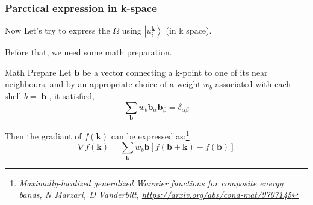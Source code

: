 \documentclass{beamer}
\begin{document}
  \begin{frame}
    \frametitle{Parctical expression in k-space}

    Now Let's try to express the \(\Omega\) using \(\left|u_i^{\mathbf{k}}\right\rangle\) (in k space). 

    Before that, we need some math preparation.

    \begin{block}{Math Prepare}
      Let \(\mathbf{b}\) be a vector connecting a k-point to one of its near neighbours, and by an appropriate choice of a weight \(w_b\) associated with each shell \(b = |\mathbf{b}|\), it satisfied, 
      \begin{equation}
        \sum_\mathbf{b}w_b \mathbf{b}_\alpha\mathbf{b}_\beta = \delta_{\alpha\beta}
      \end{equation}

      Then the gradiant of \(f(\mathbf{k})\) can be expressed as:\footnote{\tiny\emph{Maximally-localized generalized Wannier functions for composite energy bands, N Marzari, D Vanderbilt, \url{https://arxiv.org/abs/cond-mat/9707145}}}
      \begin{equation}
        \nabla{}f(\mathbf{k}) = \sum_{\mathbf{b}}w_b\mathbf{b}\left[f(\mathbf{b}+\mathbf{k}) - f(\mathbf{b})\right]
      \end{equation}
    \end{block}
  \end{frame}
\end{document}

